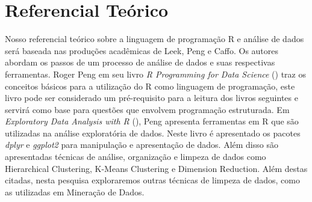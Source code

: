 \chapter[Referencial Teórico]{Referencial Teórico}

Nosso referencial teórico sobre a linguagem de programação R e análise de dados 
será baseada nas produções acadêmicas de Leek, Peng e Caffo. Os autores abordam os passos de um processo de análise de dados e 
suas respectivas ferramentas. Roger Peng em seu livro \emph{R Programming for Data 
Science} (\citeyear{Peng2015a}) traz os conceitos básicos para a utilização do R como linguagem de 
programação, este livro pode ser considerado um pré-requisito para a leitura dos 
livros seguintes e servirá como base para questões que envolvem programação 
estruturada. Em \emph{Exploratory Data Analysis with R} (\citeyear{Peng2016}), Peng apresenta ferramentas 
em R que são utilizadas na análise exploratória de dados. Neste livro é 
apresentado os pacotes \emph{dplyr} \cite{Wickham2018} e \emph{ggplot2} \cite{Wickham2009} para manipulação e apresentação de 
dados. Além disso são apresentadas técnicas de análise, organização e limpeza de 
dados como Hierarchical Clustering, K-Means Clustering e Dimension Reduction. 
Além destas citadas, nesta pesquisa exploraremos outras técnicas de limpeza de 
dados, como as utilizadas em Mineração de Dados.
